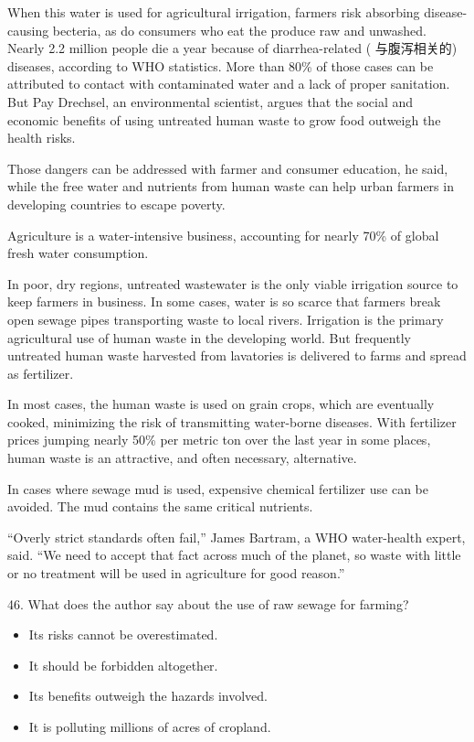 \documentclass[UTF8,11pt]{ctexart}
\begin{document}
When this water is used for agricultural irrigation, farmers risk absorbing disease-causing becteria, as do consumers who eat the produce raw and unwashed. Nearly 2.2 million people die a year because of diarrhea-related ( 与腹泻相关的) diseases, according to WHO statistics. More than 80\% of those cases can be attributed to contact with contaminated water and a lack of proper sanitation. But Pay Drechsel, an environmental scientist, argues that the social and economic benefits of using untreated human waste to grow food outweigh the health risks.


Those dangers can be addressed with farmer and consumer education, he said, while the free water and nutrients from human waste can help urban farmers in developing countries to escape poverty.


Agriculture is a water-intensive business, accounting for nearly 70\% of global fresh water consumption.


In poor, dry regions, untreated wastewater is the only viable irrigation source to keep farmers in business. In some cases, water is so scarce that farmers break open sewage pipes transporting waste to local rivers. Irrigation is the primary agricultural use of human waste in the developing world. But frequently untreated human waste harvested from lavatories is delivered to farms and spread as fertilizer.


In most cases, the human waste is used on grain crops, which are eventually cooked, minimizing the risk of transmitting water-borne diseases. With fertilizer prices jumping nearly 50\% per metric ton over the last year in some places, human waste is an attractive, and often necessary, alternative.


In cases where sewage mud is used, expensive chemical fertilizer use can be avoided. The mud contains the same critical nutrients.


“Overly strict standards often fail,” James Bartram, a WHO water-health expert, said. “We need to accept that fact across much of the planet, so waste with little or no treatment will be used in agriculture for good reason.”


46. What does the author say about the use of raw sewage for farming?


\begin{itemize}[leftmargin=2em,itemsep=.2em,topsep=.4em]\item[A.] Its risks cannot be overestimated.
\item[B.] It should be forbidden altogether.
\item[C.] Its benefits outweigh the hazards involved.
\item[D.] It is polluting millions of acres of cropland.
\end{itemize}
\end{document}
